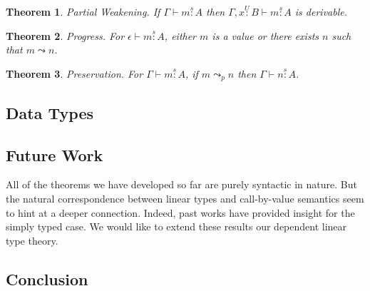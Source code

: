 \documentclass{article}
\newtheorem{theorem}{Theorem}[section]
\newcommand{\utype}{\overset{U}{:}}
\newcommand{\stype}[1]{\overset{#1}{:}}
\newcommand{\step}{\leadsto}
\newcommand{\pstep}{\leadsto_p}
\begin{document}
  \begin{theorem}
    Partial Weakening. If $\Gamma \vdash m \stype{s} A$ then $\Gamma, x \utype B \vdash m \stype{s} A$ is derivable.
  \end{theorem}

  \begin{theorem}
    Progress. For $\epsilon \vdash m \stype{s} A$, either $m$ is a value or there exists $n$ such that $m \step n$.
  \end{theorem}

  \begin{theorem}
    Preservation. For $\Gamma \vdash m \stype{s} A$, if $m \pstep n$ then $\Gamma \vdash n \stype{s} A$.
  \end{theorem}

  \subsection{Data Types}

  \subsection{Future Work}
  All of the theorems we have developed so far are purely syntactic in nature. But the natural correspondence between linear types and call-by-value semantics seem to hint at a deeper connection. Indeed, past works\cite{cbvsemantics} have provided insight for the simply typed case. We would like to extend these results our dependent linear type theory.

  \subsection{Conclusion}



\end{document}
